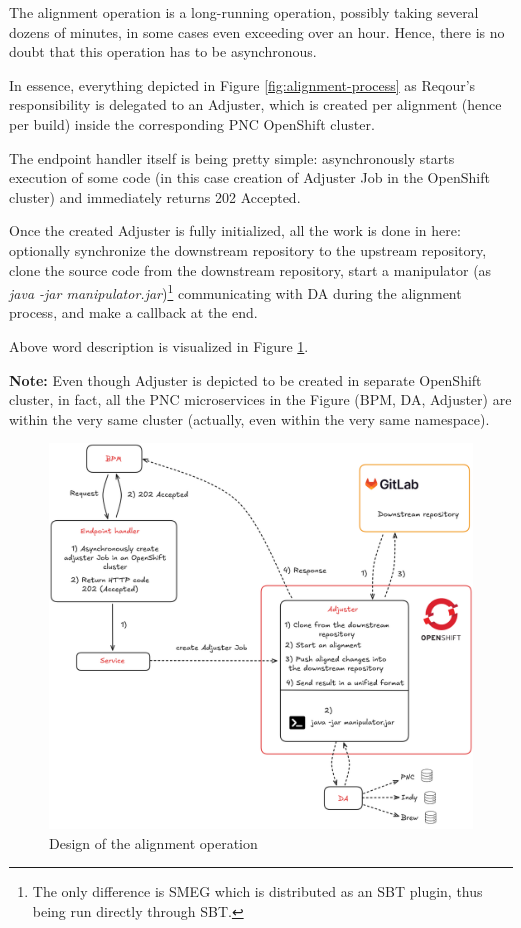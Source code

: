 \documentclass[../main.tex]{subfiles}
\begin{document}
The alignment operation is a long-running operation, possibly taking several dozens of minutes, in some cases even exceeding over an hour. Hence, there is no doubt that this operation has to be asynchronous.

In essence, everything depicted in Figure \ref{fig:alignment-process} as Reqour's responsibility is delegated to an Adjuster, which is created per alignment (hence per build) inside the corresponding PNC OpenShift cluster.

The endpoint handler itself is being pretty simple: asynchronously starts execution of some code (in this case creation of Adjuster Job in the OpenShift cluster) and immediately returns 202 Accepted.

Once the created Adjuster is fully initialized, all the work is done in here: optionally synchronize the downstream repository to the upstream repository, clone the source code from the downstream repository, start a manipulator (as \textit{java -jar manipulator.jar})\footnote{The only difference is SMEG which is distributed as an SBT plugin, thus being run directly through SBT.} communicating with DA during the alignment process, and make a callback at the end.

Above word description is visualized in Figure \ref{fig:alignment-design}.

\textbf{Note:} Even though Adjuster is depicted to be created in separate OpenShift cluster, in fact, all the PNC microservices in the Figure (BPM, DA, Adjuster) are within the very same cluster (actually, even within the very same namespace).

\begin{figure}
  \begin{center}
    \includegraphics[width=\textwidth]{images/alignment-design.png}
  \end{center}
  \caption{Design of the alignment operation}
  \label{fig:alignment-design}
\end{figure}
\end{document}

